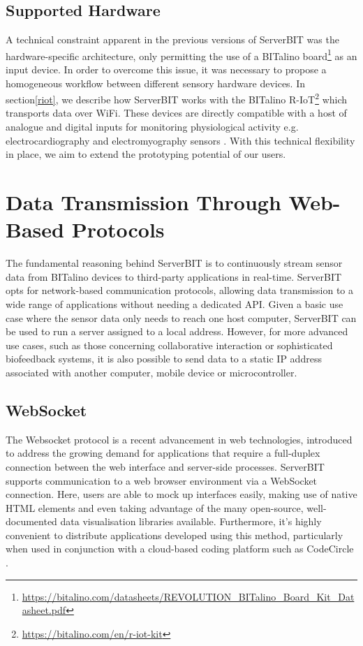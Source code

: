\subsection{Supported Hardware} \label{hardware}

A technical constraint apparent in the previous versions of ServerBIT was the hardware-specific architecture, only permitting the use of a BITalino board\footnote{\url{https://bitalino.com/datasheets/REVOLUTION_BITalino_Board_Kit_Datasheet.pdf}} as an input device. In order to overcome this issue, it was necessary to propose a homogeneous workflow between different sensory hardware devices. In section\ref{riot}, we describe how ServerBIT works with the BITalino R-IoT\footnote{\url{https://bitalino.com/en/r-iot-kit}} which transports data over WiFi. These devices are directly compatible with a host of analogue and digital inputs for monitoring physiological activity e.g. electrocardiography and electromyography sensors . With this technical flexibility in place, we aim to extend the prototyping potential of our users.
\newpage

\section{Data Transmission Through Web-Based Protocols}
The fundamental reasoning behind ServerBIT is to continuously stream sensor data from BITalino devices to third-party applications in real-time. ServerBIT opts for network-based communication protocols, allowing data transmission to a wide range of applications without needing a dedicated API. Given a basic use case where the sensor data only needs to reach one host computer, ServerBIT can be used to run a server assigned to a local address. However, for more advanced use cases, such as those concerning collaborative interaction or sophisticated biofeedback systems, it is also possible to send data to a static IP address associated with another computer, mobile device or microcontroller.

\subsection{WebSocket}

The Websocket protocol is a recent advancement in web technologies\cite{lombardi_websocket:_2015}, introduced to address the growing demand for applications that require a full-duplex connection between the web interface and server-side processes. ServerBIT supports communication to a web browser environment via a WebSocket connection. Here, users are able to mock up interfaces easily, making use of native HTML elements and even taking advantage of the many open-source, well-documented data visualisation libraries available. Furthermore, it’s highly convenient to distribute applications developed using this method, particularly when used in conjunction with a cloud-based coding platform such as CodeCircle \cite{fiala_collaborative_2016}.

